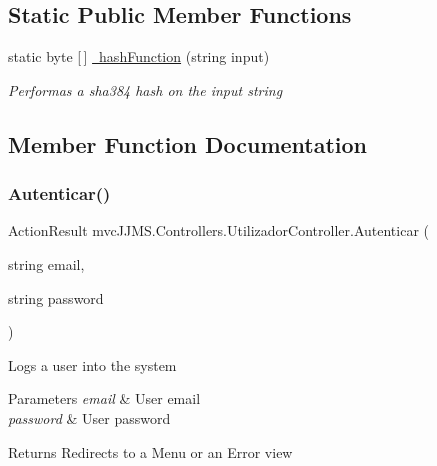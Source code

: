 \subsection*{Static Public Member Functions}
\begin{DoxyCompactItemize}
\item 
static byte \mbox{[}$\,$\mbox{]} \mbox{\hyperlink{classmvc_j_j_m_s_1_1_controllers_1_1_utilizador_controller_a72e105c651070200f84c3718fdf3c8cc}{ hash\+Function}} (string input)
\begin{DoxyCompactList}\small\item\em Performas a sha384 hash on the input string \end{DoxyCompactList}\end{DoxyCompactItemize}


\subsection{Member Function Documentation}
\mbox{\label{classmvc_j_j_m_s_1_1_controllers_1_1_utilizador_controller_af5e72a30b41eb17d41cf14d3f0afd177}} 
\subsubsection{\texorpdfstring{Autenticar()}{Autenticar()}}
{\footnotesize\ttfamily Action\+Result mvc\+J\+J\+M\+S.\+Controllers.\+Utilizador\+Controller.\+Autenticar (\begin{DoxyParamCaption}\item[{string}]{email,  }\item[{string}]{password }\end{DoxyParamCaption})\hspace{0.3cm}{\ttfamily [inline]}}



Logs a user into the system 


\begin{DoxyParams}{Parameters}
{\em email} & User email\\
\hline
{\em password} & User password\\
\hline
\end{DoxyParams}
\begin{DoxyReturn}{Returns}
Redirects to a Menu or an Error view
\end{DoxyReturn}
\mbox{\label{classmvc_j_j_m_s_1_1_controllers_1_1_utilizador_controller_abc0b8e9e7e35ee0c6f910a4fc63bb6d2}} 
